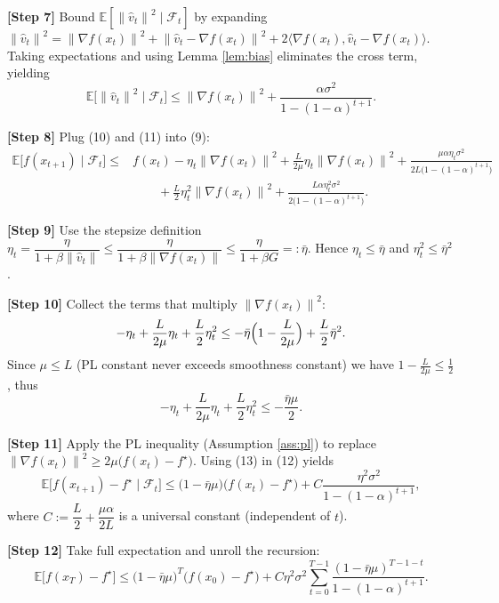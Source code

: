 \documentclass{article}
\newcommand{\EE}{\mathbb{E}}
\newcommand{\norm}[1]{\left\lVert #1\right\rVert}
\newcommand{\grad}{\nabla}
\begin{document}
\noindent\textbf{[Step 7]} Bound $\EE[\norm{\hat v_{t}}^{2}\mid\mathcal{F}_{t}]$ by expanding
$\norm{\hat v_{t}}^{2}= \norm{\grad f(x_{t})}^{2}
        +\norm{\hat v_{t}-\grad f(x_{t})}^{2}
        +2\langle\grad f(x_{t}),\hat v_{t}-\grad f(x_{t})\rangle$.
Taking expectations and using Lemma \ref{lem:bias} eliminates the cross term, yielding
\[
\EE\!\bigl[\norm{\hat v_{t}}^{2}\mid\mathcal{F}_{t}\bigr]
\le \norm{\grad f(x_{t})}^{2}
    +\frac{\alpha\sigma^{2}}{1-(1-\alpha)^{t+1}} .
\tag{11}
\]

\noindent\textbf{[Step 8]} Plug (10) and (11) into (9):
\[
\begin{aligned}
\EE\!\bigl[f(x_{t+1})\mid\mathcal{F}_{t}\bigr]
\le &
f(x_{t})
-\eta_{t}\norm{\grad f(x_{t})}^{2}
+\frac{L}{2\mu}\eta_{t}\norm{\grad f(x_{t})}^{2}
+\frac{\mu\alpha\eta_{t}\sigma^{2}}{2L\bigl(1-(1-\alpha)^{t+1}\bigr)}\\
&\qquad
+\frac{L}{2}\eta_{t}^{2}\norm{\grad f(x_{t})}^{2}
+\frac{L\alpha\eta_{t}^{2}\sigma^{2}}{2\bigl(1-(1-\alpha)^{t+1}\bigr)} .
\end{aligned}
\tag{12}
\]

\noindent\textbf{[Step 9]} Use the stepsize definition $\eta_{t}= \dfrac{\eta}{1+\beta\norm{\hat v_{t}}}\le \dfrac{\eta}{1+\beta\norm{\grad f(x_{t})}} \le \dfrac{\eta}{1+\beta G}=:\bar\eta$.
Hence $\eta_{t}\le\bar\eta$ and $\eta_{t}^{2}\le\bar\eta^{2}$.

\noindent\textbf{[Step 10]} Collect the terms that multiply $\norm{\grad f(x_{t})}^{2}$:
\[
-\eta_{t}+\frac{L}{2\mu}\eta_{t}+\frac{L}{2}\eta_{t}^{2}
\le -\bar\eta\Bigl(1-\frac{L}{2\mu}\Bigr)+\frac{L}{2}\bar\eta^{2}.
\]
Since $\mu\le L$ (PL constant never exceeds smoothness constant) we have $1-\frac{L}{2\mu}\le \frac12$, thus
\[
-\eta_{t}+\frac{L}{2\mu}\eta_{t}+\frac{L}{2}\eta_{t}^{2}
\le -\frac{\bar\eta\mu}{2}.
\tag{13}
\]

\noindent\textbf{[Step 11]} Apply the PL inequality (Assumption \ref{ass:pl}) to replace $\norm{\grad f(x_{t})}^{2}\ge 2\mu\bigl(f(x_{t})-f^{\star}\bigr)$.
Using (13) in (12) yields
\[
\EE\!\bigl[f(x_{t+1})-f^{\star}\mid\mathcal{F}_{t}\bigr]
\le
\bigl(1-\bar\eta\mu\bigr)\bigl(f(x_{t})-f^{\star}\bigr)
+ C\frac{\eta^{2}\sigma^{2}}{1-(1-\alpha)^{t+1}},
\tag{14}
\]
where $C:=\dfrac{L}{2}+\dfrac{\mu\alpha}{2L}$ is a universal constant (independent of $t$).

\noindent\textbf{[Step 12]} Take full expectation and unroll the recursion:
\[
\EE\!\bigl[f(x_{T})-f^{\star}\bigr]
\le
\bigl(1-\bar\eta\mu\bigr)^{T}\bigl(f(x_{0})-f^{\star}\bigr)
+ C\eta^{2}\sigma^{2}\sum_{t=0}^{T-1}\frac{(1-\bar\eta\mu)^{T-1-t}}{1-(1-\alpha)^{t+1}}.
\tag{15}
\]
\end{document}
